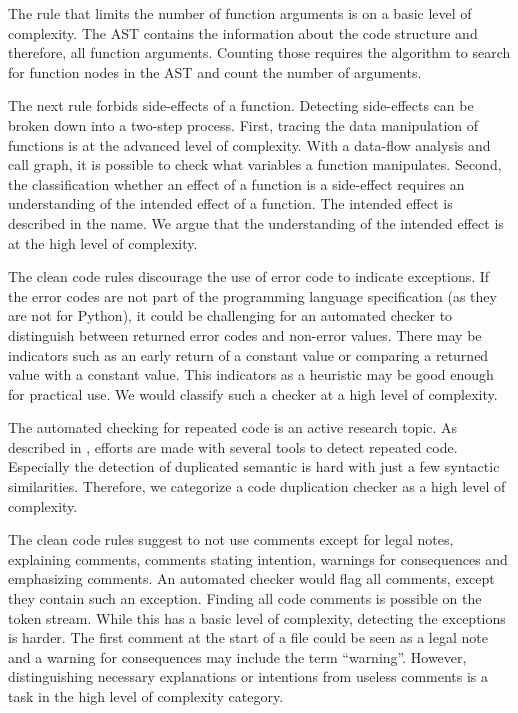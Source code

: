 The rule that limits the number of function arguments is on a basic level of complexity. The AST contains the information about the code structure and therefore, all function arguments. Counting those requires the algorithm to search for function nodes in the AST and count the number of arguments.

The next rule forbids side-effects of a function. Detecting side-effects can be broken down into a two-step process.
First, tracing the data manipulation of functions is at the advanced level of complexity. With a data-flow analysis and call graph, it is possible to check what variables a function manipulates. Second, the classification whether an effect of a function is a side-effect requires an understanding of the intended effect of a function. The intended effect is described in the name. We argue that the understanding of the intended effect is at the high level of complexity. 

The clean code rules discourage the use of error code to indicate exceptions. If the error codes are not part of the programming language specification (as they are not for Python), it could be challenging for an automated checker to distinguish between returned error codes and non-error values. There may be indicators such as an early return of a constant value or comparing a returned value with a constant value. This indicators as a heuristic may be good enough for practical use. We would classify such a checker at a high level of complexity. 

The automated checking for repeated code is an active research topic. As described in , efforts are made with several tools to detect repeated code. Especially the detection of duplicated semantic is hard with just a few syntactic similarities. Therefore, we categorize a code duplication checker as a high level of complexity.

The clean code rules suggest to not use comments except for legal notes, explaining comments, comments stating intention, warnings for consequences and emphasizing comments. An automated checker would flag all comments, except they contain such an exception. Finding all code comments is possible on the token stream. While this has a basic level of complexity, detecting the exceptions is harder. The first comment at the start of a file could be seen as a legal note and a warning for consequences may include the term \enquote{warning}. However, distinguishing necessary explanations or intentions from useless comments is a task in the high level of complexity category.


